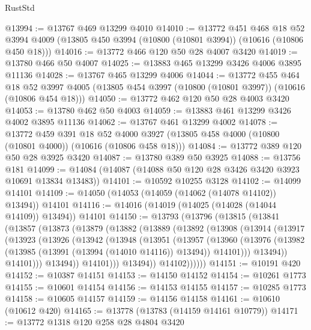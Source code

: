 \begin{lexlean}{RustStd}
\begin{coremodule}
@13994 := @13767 @469 @13299 @4010
@14010 := @13772
    @451
    @468
    @18
    @52
    @3994
    @4009
    (@13805 @450 @3994 (@10800 (@10801 @3994)) (@10616 (@10806 @450 @18)))
@14016 := @13772 @466 @120 @50 @28 @4007 @3420
@14019 := @13780 @466 @50 @4007
@14025 := @13883 @465 @13299 @3426 @4006 @3895 @11136
@14028 := @13767 @465 @13299 @4006
@14044 := @13772
    @455
    @464
    @18
    @52
    @3997
    @4005
    (@13805 @454 @3997 (@10800 (@10801 @3997)) (@10616 (@10806 @454 @18)))
@14050 := @13772 @462 @120 @50 @28 @4003 @3420
@14053 := @13780 @462 @50 @4003
@14059 := @13883 @461 @13299 @3426 @4002 @3895 @11136
@14062 := @13767 @461 @13299 @4002
@14078 := @13772
    @459
    @391
    @18
    @52
    @4000
    @3927
    (@13805 @458 @4000 (@10800 (@10801 @4000)) (@10616 (@10806 @458 @18)))
@14084 := @13772 @389 @120 @50 @28 @3925 @3420
@14087 := @13780 @389 @50 @3925
@14088 := @13756 @181
@14099 := @14084 (@14087 (@14088 @50 @120 @28 @3426 @3420 @3923 @10691 @13834 @13483))
@14101 := @10592 @10255 @3128
@14102 := @14099 @14101
@14109 := @14050 (@14053 (@14059 (@14062 (@14078 @14102)) @13494)) @14101
@14116 := @14016 (@14019 (@14025 (@14028 (@14044 @14109)) @13494)) @14101
@14150 := @13793
    (@13796
      (@13815
        (@13841
          (@13857
            (@13873
              (@13879
                (@13882
                  (@13889
                    (@13892
                      (@13908
                        (@13914
                          (@13917
                            (@13923
                              (@13926
                                (@13942
                                  (@13948
                                    (@13951
                                      (@13957
                                        (@13960
                                          (@13976
                                            (@13982
                                              (@13985 (@13991 (@13994 (@14010 @14116)) @13494))
                                              @14101)))
                                        @13494))
                                    @14101)))
                              @13494))
                          @14101)))
                    @13494))
                @14102))))))
@14151 := @10191 @420
@14152 := @10387 @14151
@14153 := @14150 @14152
@14154 := @10261 @1773
@14155 := @10601 @14154
@14156 := @14153 @14155
@14157 := @10285 @1773
@14158 := @10605 @14157
@14159 := @14156 @14158
@14161 := @10610 (@10612 @420)
@14165 := @13778 (@13783 (@14159 @14161 @10779))
@14171 := @13772 @1318 @120 @258 @28 @4804 @3420

\end{coremodule}
\end{lexlean}
